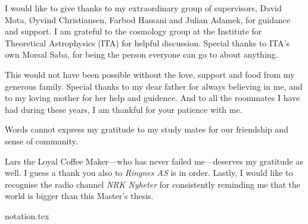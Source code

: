 \documentclass[UKenglish]{texmex/uiomasterthesis}
\begin{document}
\begin{thanks}
    I would like to give thanks to my extraordinary group of supervisors, David Mota, Øyvind Christiansen, Farbod Hassani and Julian Adamek, for guidance and support. I am grateful to the cosmology group at the Institute for Theoretical Astrophysics (ITA) for helpful discussion. Special thanks to ITA's own Morsal Saba, for being the person everyone can go to about anything.

    This would not have been possible without the love, support and food from my generous family. Special thanks to my dear father for always believing in me, and to my loving mother for her help and guidence. 
    And to all the roommates I have had during these years, I am thankful for your patience with me. %




    Words cannot express my gratitude to my study mates for our friendship and sense of community. 
    



    Lars the Loyal Coffee Maker---who has never failed me---deserves my gratitude as well. I guess a thank you also to \textit{Ringnes AS} is in order. Lastly, I would like to recognise the radio channel \textit{NRK Nyheter} for consistently reminding me that the world is bigger than this Master's thesis.

\end{thanks}



\begin{nomen}
    {notation.tex}
\end{nomen}




\end{document}
